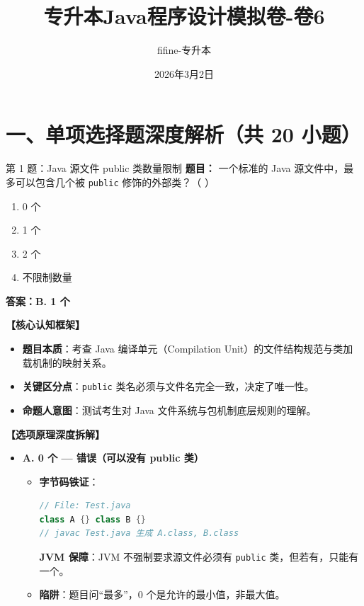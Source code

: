 ﻿\documentclass[12pt, a4paper]{ctexart}
\title{\textcolor{myblue}{\textbf{专升本Java程序设计模拟卷-卷6}}}
\author{fifine-专升本}
\date{2026年3月2日}
\begin{document}
\maketitle
\thispagestyle{empty}
\newpage

\section{一、单项选择题深度解析（共 20 小题）}

\begin{bluebox}{第 1 题：Java 源文件 public 类数量限制}
	\textbf{题目：} 一个标准的 Java 源文件中，最多可以包含几个被 \texttt{public} 修饰的外部类？（ \quad ）
	\begin{enumerate}[label=\Alph*., leftmargin=*, nosep]
		\item 0 个
		\item 1 个
		\item 2 个
		\item 不限制数量
	\end{enumerate}

	\textbf{答案：B. 1 个}

	\textbf{【核心认知框架】}
	\begin{itemize}[leftmargin=*, nosep]
		\item \textbf{题目本质}：考查 Java 编译单元（Compilation Unit）的文件结构规范与类加载机制的映射关系。
		\item \textbf{关键区分点}：\texttt{public} 类名必须与文件名完全一致，决定了唯一性。
		\item \textbf{命题人意图}：测试考生对 Java 文件系统与包机制底层规则的理解。
	\end{itemize}

	\textbf{【选项原理深度拆解】}
	\begin{itemize}[leftmargin=*, nosep]
		\item \textbf{A. 0 个 — 错误（可以没有 public 类）}
		      \begin{itemize}[leftmargin=*, nosep]
			      \item \textbf{字节码铁证}：
			            \begin{lstlisting}[language=Java]
// File: Test.java
class A {} class B {} 
// javac Test.java 生成 A.class, B.class
        \end{lstlisting}
			            \textbf{JVM 保障}：JVM 不强制要求源文件必须有 \texttt{public} 类，但若有，只能有一个。
			      \item \textbf{陷阱}：题目问“最多”，0 个是允许的最小值，非最大值。
		      \end{itemize}


\end{itemize}
\end{bluebox}
\end{document}
